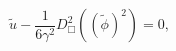 \begin{equation}
\label{Phi} \tilde{u}
-\frac{1}{6\gamma^2}D^2_\Box\left((\tilde{\phi})^2\right)=0,
\end{equation}


